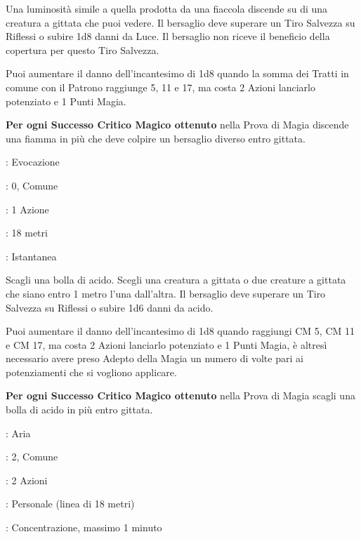 \begin{multicols}{2}
Una luminosità simile a quella prodotta da una fiaccola discende su di una creatura a gittata che puoi vedere. Il bersaglio deve superare un Tiro Salvezza su Riflessi o subire 1d8 danni da Luce. Il bersaglio non riceve il beneficio della copertura per questo Tiro Salvezza.

Puoi aumentare il danno dell'incantesimo di 1d8 quando la somma dei Tratti in comune con il Patrono raggiunge 5, 11 e 17, ma costa 2 Azioni lanciarlo potenziato e 1 Punti Magia.

\textbf{Per ogni Successo Critico Magico ottenuto} nella Prova di Magia discende una fiamma in più che deve colpire un bersaglio diverso entro gittata.

\label{Acid Splash}
\noindent\colorbox{OBSSgold!10}{
\begin{minipage}{0.95\linewidth}
\begin{description}[noitemsep, topsep=0pt, parsep=0pt, partopsep=0pt, leftmargin=0cm, labelwidth=1.3cm]
	\item[\textbf{Lista}]: Evocazione
	\item[\textbf{Livello}]: 0, Comune
	\item[\textbf{Lancio}]: 1 Azione
	\item[\textbf{Gittata}]: 18 metri
	\item[\textbf{Durata}]: Istantanea
\end{description}
\end{minipage}}\smallskip

Scagli una bolla di acido. Scegli una creatura a gittata o due creature a gittata che siano entro 1 metro l'una dall'altra. Il bersaglio deve superare un Tiro Salvezza su Riflessi o subire 1d6 danni da acido.

Puoi aumentare il danno dell'incantesimo di 1d8 quando raggiungi CM 5, CM 11 e CM 17, ma costa 2 Azioni lanciarlo potenziato e 1 Punti Magia, è altresì necessario avere preso Adepto della Magia un numero di volte pari ai potenziamenti che si vogliono applicare.

\textbf{Per ogni Successo Critico Magico ottenuto} nella Prova di Magia scagli una bolla di acido in più entro gittata.

\noindent\colorbox{OBSSgold!10}{
\begin{minipage}{0.95\linewidth}
\begin{description}[noitemsep, topsep=0pt, parsep=0pt, partopsep=0pt, leftmargin=0cm, labelwidth=1.3cm]
	\item[\textbf{Lista}]: Aria
	\item[\textbf{Livello}]: 2, Comune
	\item[\textbf{Lancio}]: 2 Azioni
	\item[\textbf{Gittata}]: Personale (linea di 18 metri)
	\item[\textbf{Durata}]: Concentrazione, massimo 1 minuto
\end{description}
\end{minipage}}\smallskip


\end{multicols}
